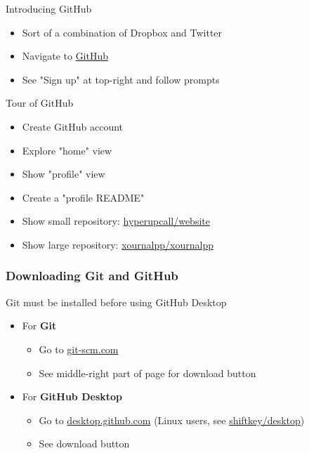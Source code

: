 \documentclass{beamer}
\begin{document}
\begin{frame}{Introducing GitHub}
	\begin{itemize}
		\item Sort of a combination of Dropbox and Twitter
	\end{itemize}
	\begin{itemize}
		\item Navigate to \href{https://github.com}{GitHub}
		\item See "Sign up" at top-right and follow prompts
	\end{itemize}

\end{frame}

\begin{frame}{Tour of GitHub}
	\begin{itemize}
		\item Create GitHub account
		\item Explore "home" view
		\item Show "profile" view
		\item Create a "profile README"
		\item Show small repository: \href{https://github.com/hyperupcall/website}{hyperupcall/website}
		\item Show large repository: \href{https://github.com/xournalpp/xournalpp}{xournalpp/xournalpp}
	\end{itemize}

\end{frame}


\begin{frame}
	\frametitle{Downloading Git and GitHub}

	Git must be installed before using GitHub Desktop
	\newline

	\begin{itemize}
		\item For \textbf{Git}
			\begin{itemize}
				\item Go to \href{https://git-scm.com/}{git-scm.com}
				\item See middle-right part of page for download button
			\end{itemize}
		\item For \textbf{GitHub Desktop}
			\begin{itemize}
				\item Go to \href{https://desktop.github.com}{desktop.github.com} (Linux users, see \href{https://github.com/shiftkey/desktop/releases}{shiftkey/desktop})
				\item See download button
			\end{itemize}
	\end{itemize}
\end{frame}
\end{document}
